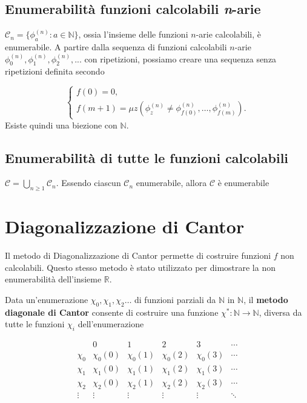 	\subsection{Enumerabilità funzioni calcolabili \textit{n}-arie}
	$\mathcal C_n = \{\phi_a^{(n)}: a \in \mathbb{N}\}$, ossia l'insieme delle funzioni $n$-arie calcolabili, è enumerabile.
	A partire dalla sequenza di funzioni calcolabili $n$-arie $\phi_0^{(n)}, \phi_1^{(n)}, \phi_2^{(n)}, ...$ con ripetizioni, possiamo creare una sequenza senza ripetizioni definita secondo
	
	$$
	\begin{cases}
		f(0) = 0, \\
		f(m+1) = \mu z (\phi_z^{(n)} \neq \phi_{f(0)}^{(n)},  \dots, \phi_{f(m)}^{(n)}).
	\end{cases}
	$$
	Esiste quindi una biezione con $\mathbb{N}$.
	
	
	\subsection{Enumerabilità di tutte le funzioni calcolabili}
	$\mathcal C = \bigcup_{n \geq 1} \mathcal C_n$. Essendo ciascun $\mathcal C_n$ enumerabile, allora $\mathcal{C}$ è enumerabile
	
	
	\section{Diagonalizzazione di Cantor}
	Il metodo di Diagonalizzazione di Cantor permette di costruire funzioni $f$ non calcolabili. Questo stesso metodo è stato utilizzato per dimostrare la non enumerabilità dell'insieme $\mathbb R$.
	
	Data un'enumerazione $\chi_0, \chi_1, \chi_2 \dots$ di funzioni parziali da $\mathbb{N}$ in $\mathbb{N}$, il \textbf{metodo diagonale di Cantor} consente di costruire una funzione $\chi^* : \mathbb{N} \to \mathbb{N}$, diversa da tutte le funzioni $\chi_i$ dell'enumerazione 
	
	$$
	\begin{array}{c|ccccc}
		& 0 & 1 & 2 & 3 & \cdots \\ \hline
		\chi_0 & \chi_0(0) & \chi_0(1) & \chi_0(2) & \chi_0(3) & \cdots \\
		\chi_1 & \chi_1(0) & \chi_1(1) & \chi_1(2) & \chi_1(3) & \cdots \\
		\chi_2 & \chi_2(0) & \chi_2(1) & \chi_2(2) & \chi_2(3) & \cdots \\
		\vdots & \vdots & \vdots & \vdots & \vdots & \ddots
	\end{array}
	$$
	
